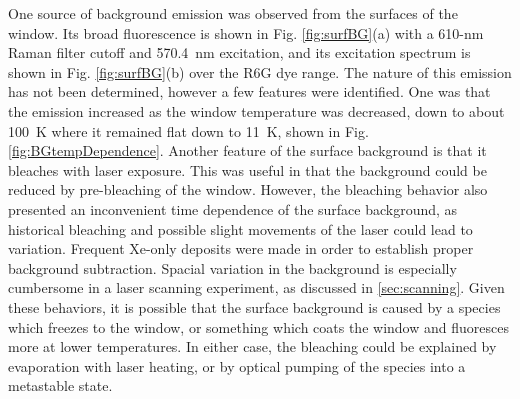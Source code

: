 One source of background emission was observed from the surfaces of the window.  Its broad fluorescence is shown in Fig. \ref{fig:surfBG}(a) with a 610-nm Raman filter cutoff and 570.4~nm excitation, and its excitation spectrum is shown in Fig. \ref{fig:surfBG}(b) over the R6G dye range.  The nature of this emission has not been determined, however a few features were identified.  One was that the emission increased as the window temperature was decreased, down to about 100~K where it remained flat down to 11~K, shown in Fig. \ref{fig:BGtempDependence}.  Another feature of the surface background is that it bleaches with laser exposure.  This was useful in that the background could be reduced by pre-bleaching of the window.  However, the bleaching behavior also presented an inconvenient time dependence of the surface background, as historical bleaching and possible slight movements of the laser could lead to variation.  Frequent Xe-only deposits were made in order to establish proper background subtraction.  Spacial variation in the background is especially cumbersome in a laser scanning experiment, as discussed in \ref{sec:scanning}.  Given these behaviors, it is possible that the surface background is caused by a species which freezes to the window, or something which coats the window and fluoresces more at lower temperatures.  In either case, the bleaching could be explained by evaporation with laser heating, or by optical pumping of the species into a metastable state.


